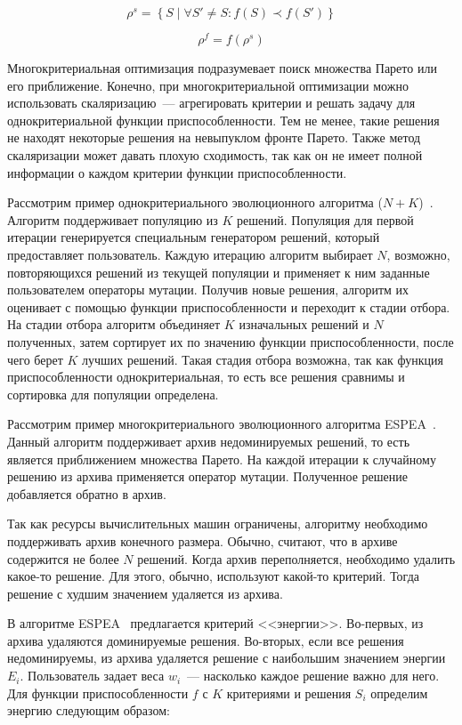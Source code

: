 \documentclass[times,specification,annotation]{itmo-student-thesis}
\begin{document}
\begin{equation} \rho^s = \left\{ S \mid \forall S' \neq S : f(S) \prec f(S') \right\} \end{equation}

\begin{equation} \rho^f = f(\rho^s) \end{equation}

Многокритериальная оптимизация подразумевает поиск множества Парето или его приближение.
Конечно, при многокритериальной оптимизации можно использовать скаляризацию~--- агрегировать критерии и решать задачу для однокритериальной функции приспособленности.
Тем не менее, такие решения не находят некоторые решения на невыпуклом фронте Парето.
Также метод скаляризации может давать плохую сходимость, так как он не имеет полной информации о каждом критерии функции приспособленности.

Рассмотрим пример однокритериального эволюционного алгоритма ($N + K$)~\cite{10.1007/BFb0056845}.
Алгоритм поддерживает популяцию из $K$ решений.
Популяция для первой итерации генерируется специальным генератором решений, который предоставляет пользователь.
Каждую итерацию алгоритм выбирает $N$, возможно, повторяющихся решений из текущей популяции и применяет к ним заданные пользователем операторы мутации.
Получив новые решения, алгоритм их оценивает с помощью функции приспособленности и переходит к стадии отбора.
На стадии отбора алгоритм объединяет $K$ изначальных решений и $N$ полученных, затем сортирует их по значению функции приспособленности, после чего берет $K$ лучших решений.
Такая стадия отбора возможна, так как функция приспособленности однокритериальная, то есть все решения сравнимы и сортировка для популяции определена.

Рассмотрим пример многокритериального эволюционного алгоритма ESPEA~\cite{10.1145/2739480.2754674}.
Данный алгоритм поддерживает архив недоминируемых решений, то есть является приближением множества Парето.
На каждой итерации к случайному решению из архива применяется оператор мутации.
Полученное решение добавляется обратно в архив.

Так как ресурсы вычислительных машин ограничены, алгоритму необходимо поддерживать архив конечного размера.
Обычно, считают, что в архиве содержится не более $N$ решений.
Когда архив переполняется, необходимо удалить какое-то решение.
Для этого, обычно, используют какой-то критерий.
Тогда решение с худшим значением удаляется из архива.

В алгоритме ESPEA~\cite{10.1145/2739480.2754674} предлагается критерий <<энергии>>.
Во-первых, из архива удаляются доминируемые решения.
Во-вторых, если все решения недоминируемы, из архива удаляется решение с наибольшим значением энергии $E_i$.
Пользователь задает веса $w_i$~--- насколько каждое решение важно для него.
Для функции приспособленности $f$ с $K$ критериями и решения $S_i$ определим энергию следующим образом:
\end{document}
